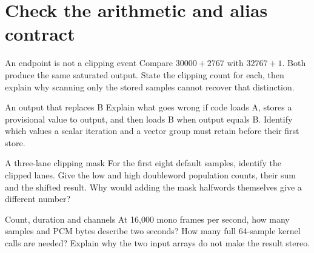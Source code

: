 \section{Check the arithmetic and alias contract}\label{pcm-questions}
\begin{MARSExercise}{An endpoint is not a clipping event}
Compare $30000+2767$ with $32767+1$. Both produce the same saturated output.
State the clipping count for each, then explain why scanning only the stored
samples cannot recover that distinction.
\end{MARSExercise}
\begin{MARSExercise}{An output that replaces B}
Explain what goes wrong if code loads A, stores a provisional value to output,
and then loads B when output equals B. Identify which values a scalar iteration
and a vector group must retain before their first store.
\end{MARSExercise}
\begin{MARSExercise}{A three-lane clipping mask}
For the first eight default samples, identify the clipped lanes. Give the low and
high doubleword population counts, their sum and the shifted result. Why would
adding the mask halfwords themselves give a different number?
\end{MARSExercise}
\begin{MARSExercise}{Count, duration and channels}
At 16,000 mono frames per second, how many samples and PCM bytes describe two
seconds? How many full 64-sample kernel calls are needed? Explain why the two
input arrays do not make the result stereo.
\end{MARSExercise}
